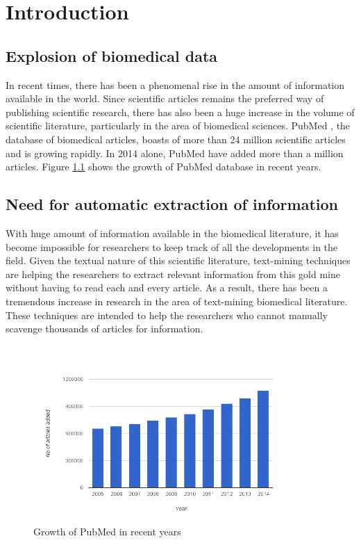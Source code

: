 \chapter{Introduction}\label{chapter:introduction}

\section{Explosion of biomedical data}

In recent times, there has been a phenomenal rise in the amount of information available in the world. Since scientific articles remains the preferred way of publishing scientific research, there has also been a huge increase in the volume of scientific literature, particularly in the area of biomedical sciences. PubMed \cite{pubmed}, the database of biomedical articles, boasts of more than 24 million scientific articles and is growing rapidly. In 2014 alone, PubMed have added more than a million articles. Figure \ref{fig:PubMedTimeLine} shows the growth of PubMed database in recent years.

\section{Need for automatic extraction of information}

With huge amount of information available in the biomedical literature, it has become impossible for researchers to keep track of all the developments in the field. Given the textual nature of this scientific literature, text-mining techniques are helping the researchers to extract relevant information from this gold mine without having to read each and every article. As a result, there has been a tremendous increase in research in the area of text-mining biomedical literature. These techniques are intended to help the researchers who cannot manually scavenge thousands of articles for information.

\begin{figure}
\centering
\includegraphics[scale=0.5]{figures/PubMedTimeLine.png}
\caption{Growth of PubMed in recent years}\label{fig:PubMedTimeLine}
\end{figure}


